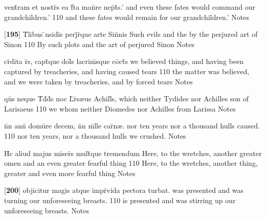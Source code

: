 \latline
  {vent\={}ram et nostr\={}s ea f\={}ta man\={}re nep\={}t\={}s.'}
	{ and even these fates would command our grandchildren.'  }
  {110}
  { and these fates would remain for our grandchildren.'  }
  { Notes }


\latline
  {[\textbf{195}] T\={}libus \={\macron {\i}}nsidi\={\macron {\i}}s perj\={}r\={\macron {\i}}que arte Sin\={}nis}
	{ Such evils and the by the perjured art of Sinon }
  {110}
  { By such plots and the art of perjured  Sinon }           
  { Notes }


\latline
  {cr\={}dita r\={}s, capt\={\macron {\i}}que dol\={\macron {\i}}s lacrim\={\macron {\i}}sque co\={}ct\={\macron {\i}}s}
	{ we believed things, and having been captured by treacheries, and having caused tears }
  {110}
  { the matter was believed, and we were taken by treacheries, and by forced tears }
  { Notes }


\latline
  {qu\={}s neque T\={}d\={\macron {\i}}d\={}s noc L\={}r\={\macron {\i}}s{\ae}us Achill\={}s,}
	{ which neither Tydides nor Achilles son of Larisaeus }
  {110}
  { we whom neither Diomedes nor Achilles from Larissa }
  { Notes }


\latline
  {n\={}n ann\={\macron {\i}} domu\={}re decem, n\={}n m\={\macron {\i}}lle car\={\macron {\i}}n{\ae}.}
	{ nor ten years nor a thousand hulls caused. }
  {110}
  { nor ten years, nor a thousand hulls we crushed. }
  { Notes }


\latline
  {H\={\macron {\i}}c aliud majus miser\={\macron {\i}}s mult\={}que tremendum}
	{ Here, to the wretches, another greater omen and an even greater fearful thing }
  {110}
  { Here, to the wretches, another thing, greater and even more fearful thing }
  { Notes }



\latline
  {[\textbf{200}] objicitur magis atque impr\={}vida pectora turbat.}
	{ was presented and was turning our unforeseeing breasts. }
  {110}
  { is presented and was stirring up our unforeseeing breasts. }
  { Notes }


